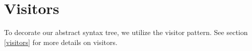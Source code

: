 \section{Visitors}
To decorate our abstract syntax tree, we utilize the visitor pattern. 
See section \ref{visitors} for more details on visitors.


